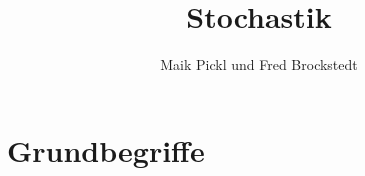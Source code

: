 \documentclass[10pt,a4paper]{report}
\author{Maik Pickl und Fred Brockstedt}
\title{Stochastik}
\numberwithin{equation}{section}
\numberwithin{figure}{section}
\theoremstyle{plain}
\theoremstyle{definition}
\theoremstyle{remark}
\theoremstyle{plain}
\newcommand{\1}{ \mathbb{1} } %
\begin{document}


\tableofcontents{}
\chapter{Grundbegriffe}
\end{document}
